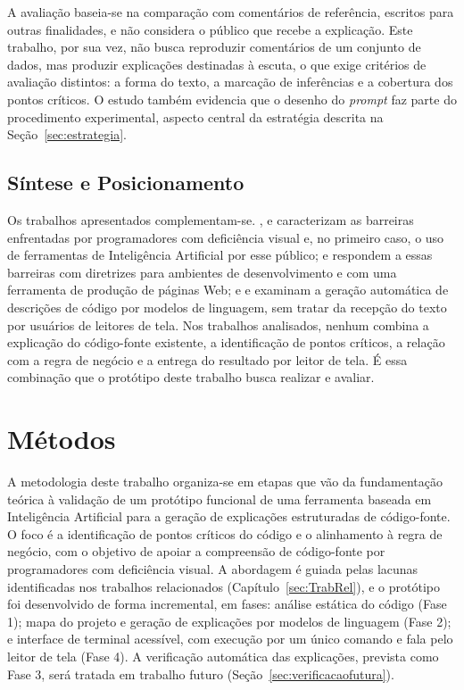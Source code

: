 \documentclass[
    12pt,                   %
    openright,              %
    oneside,                %
    a4paper,                %
    sumario=tradicional,    %
    english,                %
    brazil,                 %
    ]{abntex2}
\begin{document}
A avaliação baseia-se na comparação com comentários de referência, escritos para outras finalidades, e não considera o público que recebe a explicação. Este trabalho, por sua vez, não busca reproduzir comentários de um conjunto de dados, mas produzir explicações destinadas à escuta, o que exige critérios de avaliação distintos: a forma do texto, a marcação de inferências e a cobertura dos pontos críticos. O estudo também evidencia que o desenho do \textit{prompt} faz parte do procedimento experimental, aspecto central da estratégia descrita na Seção~\ref{sec:estrategia}.

\section{Síntese e Posicionamento}

Os trabalhos apresentados complementam-se. \textcite{latinoware34224}, \textcite{latinoware20457} e \textcite{acad54431201} caracterizam as barreiras enfrentadas por programadores com deficiência visual e, no primeiro caso, o uso de ferramentas de Inteligência Artificial por esse público; \textcite{latinoware37693} e \textcite{latinoware40920} respondem a essas barreiras com diretrizes para ambientes de desenvolvimento e com uma ferramenta de produção de páginas Web; e \textcite{sun2023chatgptsum} e \textcite{hou2024llmse} examinam a geração automática de descrições de código por modelos de linguagem, sem tratar da recepção do texto por usuários de leitores de tela. Nos trabalhos analisados, nenhum combina a explicação do código-fonte existente, a identificação de pontos críticos, a relação com a regra de negócio e a entrega do resultado por leitor de tela. É essa combinação que o protótipo deste trabalho busca realizar e avaliar.



\chapter{Métodos}\label{sec:metodos}

A metodologia deste trabalho organiza-se em etapas que vão da fundamentação teórica à validação de um protótipo funcional de uma ferramenta baseada em Inteligência Artificial para a geração de explicações estruturadas de código-fonte. O foco é a identificação de pontos críticos do código e o alinhamento à regra de negócio, com o objetivo de apoiar a compreensão de código-fonte por programadores com deficiência visual. A abordagem é guiada pelas lacunas identificadas nos trabalhos relacionados (Capítulo~\ref{sec:TrabRel}), e o protótipo foi desenvolvido de forma incremental, em fases: análise estática do código (Fase 1); mapa do projeto e geração de explicações por modelos de linguagem (Fase 2); e interface de terminal acessível, com execução por um único comando e fala pelo leitor de tela (Fase 4). A verificação automática das explicações, prevista como Fase 3, será tratada em trabalho futuro (Seção~\ref{sec:verificacaofutura}).
\end{document}
